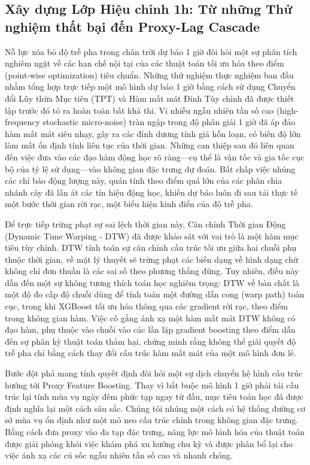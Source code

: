\documentclass[pdflatex,sn-mathphys-num]{sn-jnl}%
\theoremstyle{thmstyleone}%
\theoremstyle{thmstyletwo}%
\theoremstyle{thmstylethree}%
\begin{document}
\subsection{Xây dựng Lớp Hiệu chỉnh 1h: Từ những Thử nghiệm thất bại đến Proxy-Lag Cascade}\label{subsec2_6}

Nỗ lực xóa bỏ độ trễ pha trong chân trời dự báo 1 giờ đòi hỏi một sự phân tích nghiêm ngặt về các hạn chế nội tại của các thuật toán tối ưu hóa theo điểm (point-wise optimization) tiêu chuẩn. Những thử nghiệm thực nghiệm ban đầu nhằm tổng hợp trực tiếp một mô hình dự báo 1 giờ bằng cách sử dụng Chuyển đổi Lũy thừa Mục tiêu (TPT) và Hàm mất mát Đỉnh Tùy chỉnh đã được thiết lập trước đó tỏ ra hoàn toàn bất khả thi. Vi nhiễu ngẫu nhiên tần số cao (high-frequency stochastic micro-noise) tràn ngập trong độ phân giải 1 giờ đã áp đảo hàm mất mát siêu nhạy, gây ra các đỉnh dương tính giả hỗn loạn, có biên độ lớn làm mất ổn định tính liên tục của thời gian. Những can thiệp sau đó liên quan đến việc đưa vào các đạo hàm động học rõ ràng---cụ thể là vận tốc và gia tốc cục bộ của tỷ lệ sử dụng---vào không gian đặc trưng dự đoán. Bất chấp việc nhúng các chỉ báo động lượng này, quán tính theo điểm quá lớn của các phân chia nhánh cây đã lấn át các tín hiệu động học, khiến dự báo luôn đi sau tải thực tế một bước thời gian rời rạc, một biểu hiện kinh điển của độ trễ pha.

Để trực tiếp trừng phạt sự sai lệch thời gian này, Căn chỉnh Thời gian Động (Dynamic Time Warping - DTW) đã được khảo sát với vai trò là một hàm mục tiêu tùy chỉnh. DTW tính toán sự căn chỉnh cấu trúc tối ưu giữa hai chuỗi phụ thuộc thời gian, về mặt lý thuyết sẽ trừng phạt các biến dạng về hình dạng chứ không chỉ đơn thuần là các sai số theo phương thẳng đứng. Tuy nhiên, điều này dẫn đến một sự không tương thích toán học nghiêm trọng: DTW về bản chất là một độ đo cấp độ chuỗi dùng để tính toán một đường dẫn cong (warp path) toàn cục, trong khi XGBoost tối ưu hóa thông qua các gradient rời rạc, theo điểm trong không gian hàm. Việc cố gắng ánh xạ một hàm mất mát DTW không có đạo hàm, phụ thuộc vào chuỗi vào các lần lặp gradient boosting theo điểm dẫn đến sự phân kỳ thuật toán thảm hại, chứng minh rằng không thể giải quyết độ trễ pha chỉ bằng cách thay đổi cấu trúc hàm mất mát của một mô hình đơn lẻ.

Bước đột phá mang tính quyết định đòi hỏi một sự dịch chuyển hệ hình cấu trúc hướng tới Proxy Feature Boosting. Thay vì bắt buộc mô hình 1 giờ phải tái cấu trúc lại tính mùa vụ ngày đêm phức tạp ngay từ đầu, mục tiêu toán học đã được định nghĩa lại một cách sâu sắc. Chúng tôi nhúng một cách có hệ thống đường cơ sở mùa vụ ổn định như một mỏ neo cấu trúc chính trong không gian đặc trưng. Bằng cách đưa proxy vào đa tạp đặc trưng, năng lực mô hình hóa của thuật toán được giải phóng khỏi việc khám phá xu hướng chu kỳ và được phân bổ lại cho việc ánh xạ các cú sốc ngẫu nhiên tần số cao và nhanh chóng.
\end{document}
